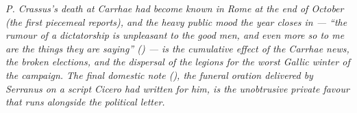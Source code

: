 \textit{P. Crassus's death at Carrhae had become known in
Rome at the end of October (the first piecemeal reports), and
the heavy public mood the year closes in --- ``the rumour of
a dictatorship is unpleasant to the good men, and even more
so to me are the things they are saying'' () ---
is the cumulative effect of the Carrhae news, the broken
elections, and the dispersal of the legions for the worst
Gallic winter of the campaign. The final domestic note
(), the funeral oration delivered by Serranus
on a script Cicero had written for him, is the unobtrusive
private favour that runs alongside the political letter.}
